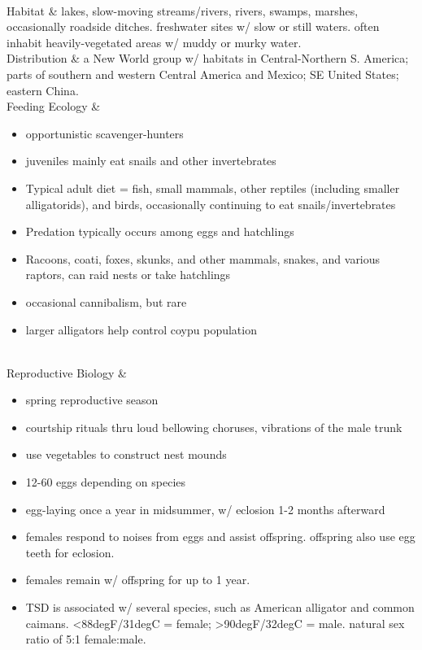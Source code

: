\begin{center}
\begin{longtabu}
\begin{itemize}[noitemsep]
	\end{itemize}
	\\
	\hline
	Habitat & 
	lakes, slow-moving streams/rivers, rivers, swamps, marshes, occasionally roadside ditches. freshwater sites w/ slow or still waters. often inhabit heavily-vegetated areas w/ muddy or murky water.
	\\
	\hline
	Distribution & 
	a New World group w/ habitats in Central-Northern S. America; parts of southern and western Central America and Mexico; SE United States; eastern China.
	\\
	\hline
	Feeding Ecology & 
	\begin{itemize}[noitemsep]
		\item opportunistic scavenger-hunters
		\item juveniles mainly eat snails and other invertebrates
		\item Typical adult diet = fish, small mammals, other reptiles (including smaller alligatorids), and birds, occasionally continuing to eat snails/invertebrates
		\item Predation typically occurs among eggs and hatchlings
		\item Racoons, coati, foxes, skunks, and other mammals, snakes, and various raptors, can raid nests or take hatchlings
		\item occasional cannibalism, but rare
		\item larger alligators help control coypu population
	\end{itemize}
	\\
	\hline
	Reproductive Biology & 
	\begin{itemize}[noitemsep]
		\item spring reproductive season
		\item courtship rituals thru loud bellowing choruses, vibrations of the male trunk
		\item use vegetables to construct nest mounds
		\item 12-60 eggs depending on species
		\item egg-laying once a year in midsummer, w/ eclosion 1-2 months afterward
		\item females respond to noises from eggs and assist offspring. offspring also use egg teeth for eclosion.
		\item females remain w/ offspring for up to 1 year.
		\item TSD is associated w/ several species, such as American alligator and common caimans. <88degF/31degC = female; >90degF/32degC = male. natural sex ratio of 5:1 female:male.

\end{itemize}
\end{longtabu}
\end{center}
